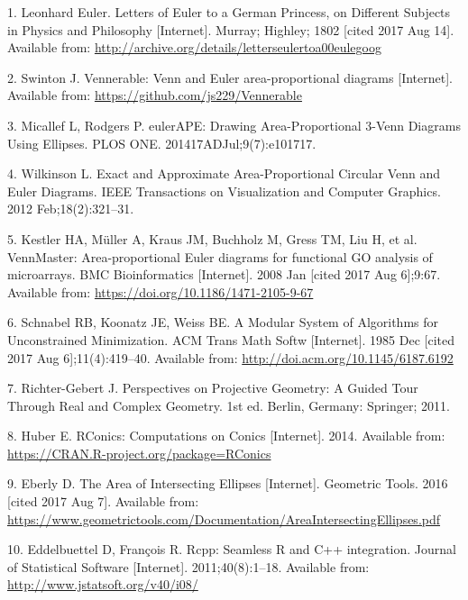\documentclass[
  headsepline=true,headings=standardclasses%
]{scrartcl}
\theoremstyle{definition}
\theoremstyle{definition}
\theoremstyle{remark}
\begin{document}
\hypertarget{refs}{}
\hypertarget{ref-euler_1802}{}
1. Leonhard Euler. Letters of Euler to a German Princess, on Different
Subjects in Physics and Philosophy {[}Internet{]}. Murray; Highley; 1802
{[}cited 2017 Aug 14{]}. Available from:
\url{http://archive.org/details/letterseulertoa00eulegoog}

\hypertarget{ref-swinton_2011}{}
2. Swinton J. Vennerable: Venn and Euler area-proportional diagrams
{[}Internet{]}. Available from:
\url{https://github.com/js229/Vennerable}

\hypertarget{ref-micallef_2014}{}
3. Micallef L, Rodgers P. eulerAPE: Drawing Area-Proportional 3-Venn
Diagrams Using Ellipses. PLOS ONE. 201417ADJul;9(7):e101717.

\hypertarget{ref-wilkinson_2012}{}
4. Wilkinson L. Exact and Approximate Area-Proportional Circular Venn
and Euler Diagrams. IEEE Transactions on Visualization and Computer
Graphics. 2012 Feb;18(2):321--31.

\hypertarget{ref-kestler_2008}{}
5. Kestler HA, Müller A, Kraus JM, Buchholz M, Gress TM, Liu H, et al.
VennMaster: Area-proportional Euler diagrams for functional GO analysis
of microarrays. BMC Bioinformatics {[}Internet{]}. 2008 Jan {[}cited
2017 Aug 6{]};9:67. Available from:
\url{https://doi.org/10.1186/1471-2105-9-67}

\hypertarget{ref-schnabel_1985}{}
6. Schnabel RB, Koonatz JE, Weiss BE. A Modular System of Algorithms for
Unconstrained Minimization. ACM Trans Math Softw {[}Internet{]}. 1985
Dec {[}cited 2017 Aug 6{]};11(4):419--40. Available from:
\url{http://doi.acm.org/10.1145/6187.6192}

\hypertarget{ref-richter-gebert_2011}{}
7. Richter-Gebert J. Perspectives on Projective Geometry: A Guided Tour
Through Real and Complex Geometry. 1st ed. Berlin, Germany: Springer;
2011.

\hypertarget{ref-huber_2014}{}
8. Huber E. RConics: Computations on Conics {[}Internet{]}. 2014.
Available from: \url{https://CRAN.R-project.org/package=RConics}

\hypertarget{ref-eberly_area_2016}{}
9. Eberly D. The Area of Intersecting Ellipses {[}Internet{]}. Geometric
Tools. 2016 {[}cited 2017 Aug 7{]}. Available from:
\url{https://www.geometrictools.com/Documentation/AreaIntersectingEllipses.pdf}

\hypertarget{ref-eddelbuettel_2011}{}
10. Eddelbuettel D, François R. Rcpp: Seamless R and C++ integration.
Journal of Statistical Software {[}Internet{]}. 2011;40(8):1--18.
Available from: \url{http://www.jstatsoft.org/v40/i08/}
\end{document}
